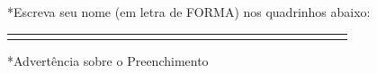 \documentclass[14pt]{report}
\begin{document}
*Escreva seu nome (em letra de FORMA) nos quadrinhos abaixo:
\begin{center}
 \begin{tabular}{|p{0.3cm}|p{0.3cm}|p{0.3cm}|p{0.3cm}|p{0.3cm}|p{0.3cm}|p{0.3cm}|p{0.3cm}|p{0.3cm}|p{0.3cm}|p{0.3cm}|p{0.3cm}|p{0.3cm}|p{0.3cm}|p{0.3cm}|p{0.3cm}|p{0.3cm}|p{0.3cm}|p{0.3cm}|p{0.3cm}|p{0.3cm}|p{0.3cm}|p{0.3cm}|p{0.3cm}|p{0.3cm}|p{0.3cm}|p{0.3cm}|}
 \hline  &  &  &  &  &  &  &  &  &  &  &  &  &  &  &  &  &  &  &  &  &  &  &  &  &  &    \\ 
 \hline  &  &  &  &  &  &  &  &  &  &  &  &  &  &  &  &  &  &  &  &  &  &  &  &  &  &    \\ 
 \hline 
\end{tabular}
\end{center}
*Advertência sobre o Preenchimento\\
\end{document}
